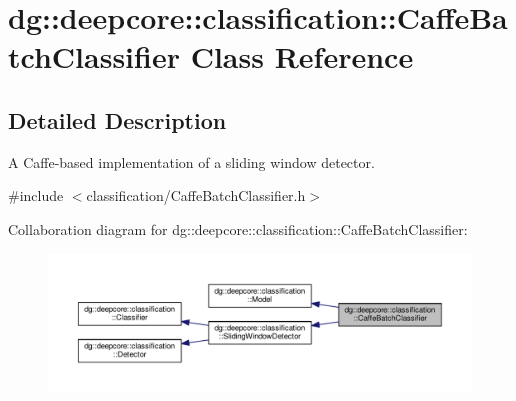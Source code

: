 \hypertarget{classdg_1_1deepcore_1_1classification_1_1_caffe_batch_classifier}{}\section{dg\+:\+:deepcore\+:\+:classification\+:\+:Caffe\+Batch\+Classifier Class Reference}
\label{classdg_1_1deepcore_1_1classification_1_1_caffe_batch_classifier}


\subsection{Detailed Description}
A Caffe-\/based implementation of a sliding window detector. 

{\ttfamily \#include $<$classification/\+Caffe\+Batch\+Classifier.\+h$>$}



Collaboration diagram for dg\+:\+:deepcore\+:\+:classification\+:\+:Caffe\+Batch\+Classifier\+:
\nopagebreak
\begin{figure}[H]
\begin{center}
\leavevmode
\includegraphics[width=350pt]{classdg_1_1deepcore_1_1classification_1_1_caffe_batch_classifier__coll__graph}
\end{center}
\end{figure}
